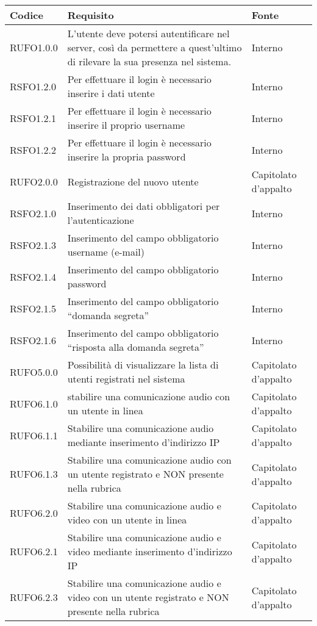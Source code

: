 \begin{center}
\begin{longtable}{lp{}l}
\toprule Codice & Requisito & Fonte\\
\midrule
RUFO1.0.0 & L'utente deve potersi autentificare nel server, così da permettere a quest'ultimo di rilevare la sua presenza nel sistema. & Interno \\
RSFO1.2.0 & Per effettuare il login è necessario inserire i dati utente & Interno\\
RSFO1.2.1 & Per effettuare il login è necessario inserire il proprio username & Interno\\
RSFO1.2.2 & Per effettuare il login è necessario inserire la propria password & Interno\\
RUFO2.0.0 & Registrazione del nuovo utente & Capitolato d'appalto \\
RSFO2.1.0 & Inserimento dei dati obbligatori per l’autenticazione & Interno \\
RSFO2.1.3 & Inserimento del campo obbligatorio username (e-mail) & Interno\\
RSFO2.1.4 & Inserimento del campo obbligatorio password & Interno\\
RSFO2.1.5 & Inserimento del campo obbligatorio ``domanda segreta'' & Interno\\
RSFO2.1.6 & Inserimento del campo obbligatorio ``risposta alla domanda segreta'' & Interno\\
RUFO5.0.0 & Possibilità di visualizzare la lista di utenti registrati nel sistema & Capitolato d'appalto \\
RUFO6.1.0 & stabilire una comunicazione audio con un utente in linea & Capitolato d'appalto \\
RUFO6.1.1 & Stabilire una comunicazione audio mediante inserimento d'indirizzo IP & Capitolato d'appalto \\
RUFO6.1.3 & Stabilire una comunicazione audio con un utente registrato e NON presente nella rubrica & Capitolato d'appalto \\
RUFO6.2.0 & Stabilire una comunicazione audio e video con un utente in linea & Capitolato d'appalto \\
RUFO6.2.1 & Stabilire una comunicazione audio e video mediante inserimento d'indirizzo IP & Capitolato d'appalto \\
RUFO6.2.3 & Stabilire una comunicazione audio e video con un utente registrato e NON presente nella rubrica & Capitolato d'appalto \\

\end{longtable}
\end{center}

